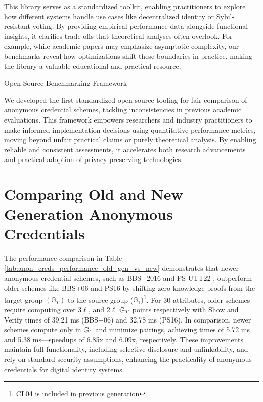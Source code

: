 This library serves as a standardized toolkit, enabling practitioners to explore how different systems handle use cases like decentralized identity or Sybil-resistant voting. By providing empirical performance data alongside functional insights, it clarifies trade-offs that theoretical analyses often overlook. For example, while academic papers may emphasize asymptotic complexity, our benchmarks reveal how optimizations shift these boundaries in practice, making the library a valuable educational and practical resource.

Open-Source Benchmarking Framework

We developed the first standardized open-source tooling for fair comparison of anonymous credential schemes, tackling inconsistencies in previous academic evaluations. This framework empowers researchers and industry practitioners to make informed implementation decisions using quantitative performance metrics, moving beyond unfair practical claims or purely theoretical analysis. By enabling reliable and consistent assessments, it accelerates both research advancements and practical adoption of privacy-preserving technologies.










\section{Comparing Old and New Generation Anonymous Credentials}
The performance comparison in Table \ref{tab:anon_creds_performance_old_gen_vs_new} demonstrates that newer anonymous credential schemes, such as BBS+2016 \cite{camenisch_anonymous_2016} and PS-UTT22 \cite{tomescu_utt_2022}, outperform older schemes like BBS+06 \cite{hutchison_constant-size_2006} and PS16 \cite{sako_short_2016} by shifting zero-knowledge proofs from the target group $(\mathbb{G}_T)$ to the source group ($\mathbb{G}_1)$\footnote{CL04 \cite{hutchison_signature_2004} is included in previous generation}. For 30 attributes, older schemes require computing over 3$\ell$, and 2$\ell$ $\mathbb{G}_T$ points respectively with Show and Verify times of 39.21 ms (BBS+06) and 32.78 ms (PS16). In comparison, newer schemes compute only in $\mathbb{G}_1$ and minimize pairings, achieving times of 5.72 ms and 5.38 ms—speedups of 6.85x and 6.09x, respectively. These improvements maintain full functionality, including selective disclosure and unlinkability, and rely on standard security assumptions, enhancing the practicality of anonymous credentials for digital identity systems.

